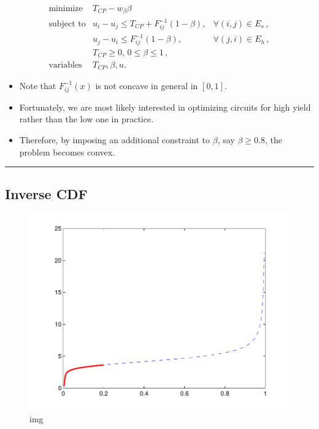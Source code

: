 \documentclass[]{article}
\providecommand{\tightlist}{%
  \setlength{\itemsep}{0pt}\setlength{\parskip}{0pt}}
\begin{document}
\[\begin{array}{cll}
   \text{minimize} &T_{CP} - w_{\beta}\beta \\
   \text{subject to} & u_i - u_j \le T_{CP} + F_{ij}^{-1}(1-\beta), & \forall (i,j) \in E_s \,,\\
                     & u_j - u_i \le F_{ij}^{-1}(1-\beta), & \forall (j,i) \in E_h \,, \\
                     & T_{CP} \ge 0, \, 0 \le \beta \le 1 \, , \\
    \text{variables} &T_{CP},\beta, u.
   \end{array}\]

\begin{itemize}
\tightlist
\item
  Note that \(F_{ij}^{-1}(x)\) is not concave in general in \([0,1]\).
\item
  Fortunately, we are most likely interested in optimizing circuits for
  high yield rather than the low one in practice.
\item
  Therefore, by imposing an additional constraint to \(\beta\), say
  \(\beta \geq 0.8\), the problem becomes convex.
\end{itemize}

\begin{center}\rule{0.5\linewidth}{\linethickness}\end{center}

\hypertarget{inverse-cdf}{%
\subsection{Inverse CDF}\label{inverse-cdf}}

\begin{figure}
\centering
\includegraphics{ellipsoid.files/Fig2-b-invcdf.pdf}
\caption{img}
\end{figure}
\end{document}
